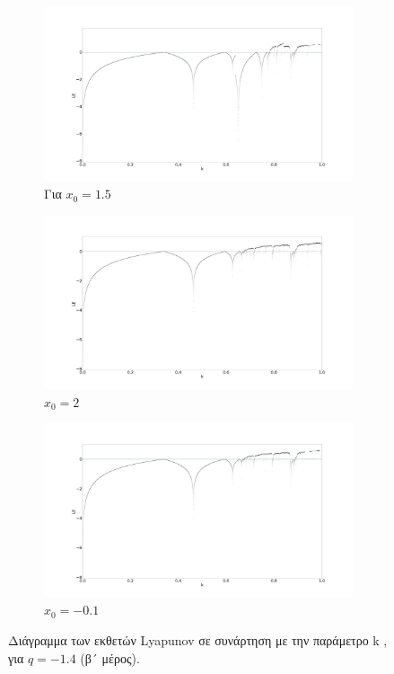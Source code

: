 \begin{figure}[ht]
	\centering
	
	\begin{subfigure}[b]{0.7\textwidth}
		\centering
		\includegraphics[width=\textwidth]{LateX images/graphs q16/g10}
		\caption{Για \(x_0=1.5\)}
		\label{f:g36}
	\end{subfigure}
	\hfill
	\begin{subfigure}[b]{0.7\textwidth}
		\centering
		\includegraphics[width=\textwidth]{LateX images/graphs q16/g11}
		\caption{\(x_0=2\)}
		\label{f:g37}
	\end{subfigure}
	\hfill
	\begin{subfigure}[b]{0.7\textwidth}
		\centering
		\includegraphics[width=\textwidth]{LateX images/graphs q16/g12}
		\caption{\(x_0=-0.1\)}
		\label{f:g38}
	\end{subfigure}
	\hfill
	\caption{ Διάγραμμα των εκθετών Lyapunov σε συνάρτηση με την παράμετρο k , για  $q=-1.4$ (β´ μέρος).}
\end{figure}



